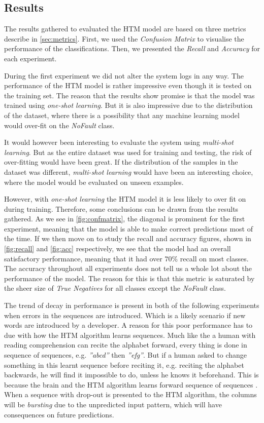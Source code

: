 \subsection{Results}
The results gathered to evaluated the HTM model are based on three metrics describe in \autoref{sec:metrics}. First, we used the \textit{Confusion Matrix} to visualise the performance of the classifications. Then, we presented the \textit{Recall} and \textit{Accuracy} for each experiment.


During the first experiment we did not alter the system logs in any way. The performance of the HTM model is rather impressive even though it is tested on the training set. The reason that the results show promise is that the model was trained using \textit{one-shot learning}. But it is also impressive due to the distribution of the dataset, where there is a possibility that any machine learning model would over-fit on the \textit{NoFault} class. 

It would however been interesting to evaluate the system using \textit{multi-shot learning}. But as the entire dataset was used for training and testing, the risk of over-fitting would have been great. If the distribution of the samples in the dataset was different, \textit{multi-shot learning} would have been an interesting choice, where the model would be evaluated on unseen examples.


However, with \textit{one-shot learning} the HTM model it is less likely to over fit on during training. Therefore, some conclusions can be drawn from the results gathered. As we see in \autoref{fig:confmatrix}, the diagonal is prominent for the first experiment, meaning that the model is able to make correct predictions most of the time. If we then move on to study the recall and accuracy figures, shown in \autoref{fig:recall} and \autoref{fig:acc} respectively, we see that the model had an overall satisfactory performance, meaning that it had over $70\%$ recall on most classes. The accuracy throughout all experiments does not tell us a whole lot about the performance of the model. The reason for this is that this metric is saturated by the sheer size of \textit{True Negatives} for all classes except the \textit{NoFault} class.


The trend of decay in performance is present in both of the following experiments when errors in the sequences are introduced. Which is a likely scenario if new words are introduced by a developer. A reason for this poor performance has to due with how the HTM algorithm learns sequences. Much like the a human with reading comprehension can recite the alphabet forward, every thing is done in sequence of sequences, e.g. \textit{''abcd''} then \textit{''efg''}. But if a human asked to change something in this learnt sequence before reciting it, e.g. reciting the alphabet backwards, he will find it impossible to do, unless he knows it beforehand. This is because the brain and the HTM algorithm learns forward sequence of sequences \cite{Kurzweil:2013:CMS:2534455, 10.3389/fncir.2016.00023}. When a sequence with drop-out is presented to the HTM algorithm, the columns will be \textit{bursting} due to the unpredicted input pattern, which will have consequences on future predictions.  


